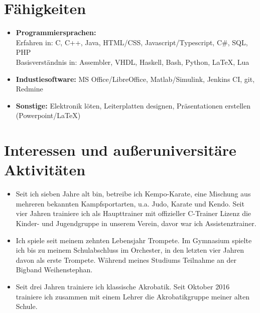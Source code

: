\documentclass[11pt,a4paper,sans]{moderncv}        %
\begin{document}
\section{Fähigkeiten}

\vspace{6pt}

\begin{itemize}

\item \textbf{Programmiersprachen:}\\ Erfahren in: C, C++, Java, HTML/CSS, Javascript/Typescript, C\#, SQL, PHP \\ Basisverständnis in: Assembler, VHDL, Haskell, Bash, Python, LaTeX, Lua

\vspace{6pt}

\item \textbf{Industiesoftware:} MS Office/LibreOffice, Matlab/Simulink, Jenkins CI, git, Redmine

\vspace{6pt}

\item \textbf{Sonstige:} Elektronik löten, Leiterplatten designen, Präsentationen erstellen (Powerpoint/LaTeX)

\end{itemize}

\section{Interessen und außeruniversitäre Aktivitäten}

\vspace{6pt}

\begin{itemize}

\item{Seit ich sieben Jahre alt bin, betreibe ich Kempo-Karate, eine Mischung aus mehreren bekannten Kampfsportarten, u.a. Judo, Karate und Kendo. Seit vier Jahren trainiere ich als Haupttrainer mit offizieller C-Trainer Lizenz die Kinder- und Jugendgruppe in unserem Verein, davor war ich Assistenztrainer.}

\vspace{6pt}

\item{Ich spiele seit meinem zehnten Lebensjahr Trompete. Im Gymnasium spielte ich bis zu meinem Schulabschluss im Orchester, in den letzten vier Jahren davon als erste Trompete. Während meines Studiums Teilnahme an der Bigband Weihenstephan.}

\vspace{6pt}

\item{Seit drei Jahren trainiere ich klassische Akrobatik. Seit Oktober 2016 trainiere ich zusammen mit einem Lehrer die Akrobatikgruppe meiner alten Schule.}

\end{itemize}
\end{document}
